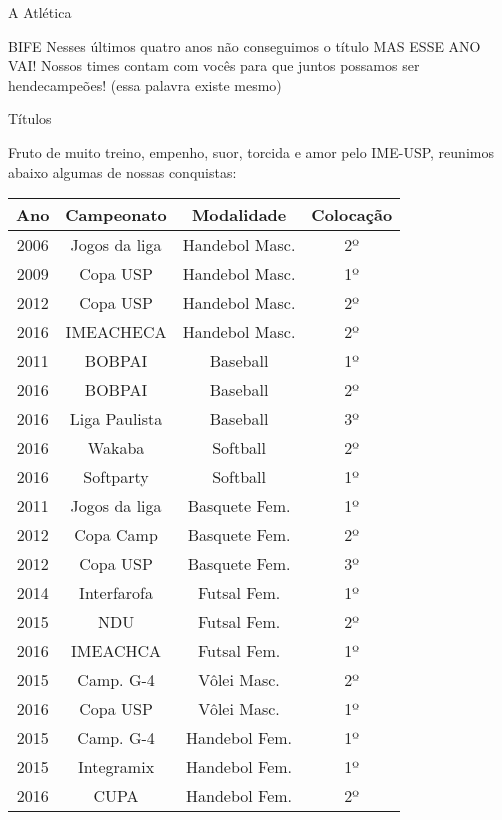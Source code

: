 \begin{secao}{A Atlética}
\begin{subsecao}{BIFE}
Nesses últimos quatro anos não conseguimos o título MAS ESSE ANO VAI! Nossos
times contam com vocês para que juntos possamos ser hendecampeões! (essa
palavra existe mesmo)

\end{subsecao}
\begin{subsecao}{Títulos}

Fruto de muito treino, empenho, suor, torcida e amor pelo IME-USP, reunimos
abaixo algumas de nossas conquistas:

\begin{center}
  \begin{tabular}{c|c|c|c}
    Ano & Campeonato & Modalidade & Colocação\\
    \hline
    2006 & Jogos da liga  & Handebol Masc.  & 2º\\
    2009 & Copa USP       & Handebol Masc.  & 1º\\
    2012 & Copa USP       & Handebol Masc.  & 2º\\
    2016 & IMEACHECA      & Handebol Masc.  & 2º\\
    2011 & BOBPAI         & Baseball        & 1º\\
    2016 & BOBPAI         & Baseball        & 2º\\
    2016 & Liga Paulista  & Baseball        & 3º\\
    2016 & Wakaba         & Softball        & 2º\\
    2016 & Softparty      & Softball        & 1º\\
    2011 & Jogos da liga  & Basquete Fem.   & 1º\\
    2012 & Copa Camp      & Basquete Fem.   & 2º\\
    2012 & Copa USP       & Basquete Fem.   & 3º\\
    2014 & Interfarofa    & Futsal Fem.     & 1º\\
    2015 & NDU            & Futsal Fem.     & 2º\\
    2016 & IMEACHCA       & Futsal Fem.     & 1º\\
    2015 & Camp. G-4      & Vôlei Masc.     & 2º\\
    2016 & Copa USP       & Vôlei Masc.     & 1º\\
    2015 & Camp. G-4      & Handebol Fem.   & 1º\\
    2015 & Integramix     & Handebol Fem.   & 1º\\
    2016 & CUPA           & Handebol Fem.   & 2º\\

\end{tabular}
\end{center}
\end{subsecao}
\end{secao}
